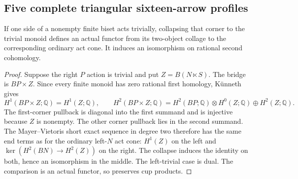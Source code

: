 \subsection{Five complete triangular sixteen-arrow profiles}

\begin{lemma}
\label{CP2:A-trivial-biset-side-H2}
If one side of a nonempty finite biset acts trivially, collapsing
that corner to the trivial monoid defines an actual functor from
its two-object collage to the corresponding ordinary act cone.
It induces an isomorphism on rational second cohomology.
\end{lemma}
\begin{proof}
Suppose the right $P$ action is trivial and put
$Z=B(N\ltimes S)$. The bridge is $BP\times Z$. Since every
finite monoid has zero rational first homology, K\"unneth gives
\[
H^1(BP\times Z;\mathbb Q)=H^1(Z;\mathbb Q),\qquad
H^2(BP\times Z;\mathbb Q)=
H^2(BP;\mathbb Q)\otimes H^0(Z;\mathbb Q)
\oplus H^2(Z;\mathbb Q).
\]
The first-corner pullback is diagonal into the first summand
and is injective because $Z$ is nonempty. The other corner
pullback lies in the second summand. The Mayer--Vietoris
short exact sequence in degree two therefore has the same
end terms as for the ordinary left-$N$ act cone: $H^1(Z)$ on
the left and $\ker(H^2(BN)\to H^2(Z))$ on the right. The
collapse induces the identity on both, hence an isomorphism
in the middle. The left-trivial case is dual. The comparison
is an actual functor, so preserves cup products.
\end{proof}

